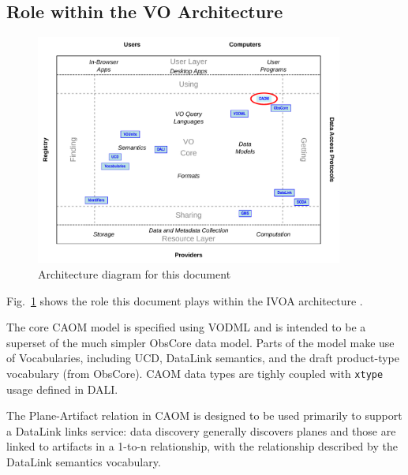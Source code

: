 \documentclass[11pt,a4paper]{ivoa}
\begin{document}
\subsection{Role within the VO Architecture}

\begin{figure}
\centering


\includegraphics[width=0.9\textwidth]{role_diagram.pdf}
\caption{Architecture diagram for this document}
\label{fig:archdiag}
\end{figure}

Fig.~\ref{fig:archdiag} shows the role this document plays within the
IVOA architecture \citep{2021ivoa.spec.1101D}.

The core CAOM model is specified using VODML and is intended to be a superset
of the much simpler ObsCore data model. Parts of the model make use of Vocabularies,
including UCD, DataLink semantics, and the draft product-type vocabulary (from ObsCore).
CAOM data types are tighly coupled with \verb|xtype| usage defined in DALI.

The Plane-Artifact relation in CAOM is designed to be used primarily to support a
DataLink links service: data discovery generally discovers planes and those are linked
to artifacts in a 1-to-n relationship, with the relationship described by the DataLink
semantics vocabulary.
\end{document}
